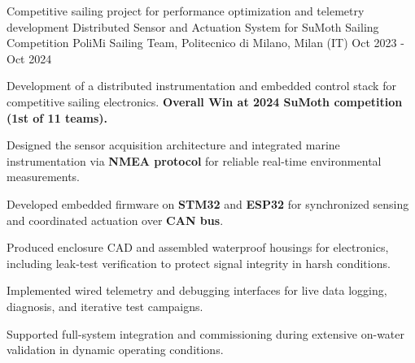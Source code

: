 
\cventry
{Competitive sailing project for performance optimization and telemetry development}
{Distributed Sensor and Actuation System for SuMoth Sailing Competition}
{PoliMi Sailing Team, Politecnico di Milano, Milan (IT)}
{Oct 2023 - Oct 2024}
{
    Development of a distributed instrumentation and embedded control stack for competitive sailing electronics. \textbf{Overall Win at 2024 SuMoth competition (1st of 11 teams).}
    \newline
    \vspace{4mm}
    \begin{cvitems}
        \item {Designed the sensor acquisition architecture and integrated marine instrumentation via \textbf{NMEA protocol} for reliable real-time environmental measurements.}
        \item {Developed embedded firmware on \textbf{STM32} and \textbf{ESP32} for synchronized sensing and coordinated actuation over \textbf{CAN bus}.}
        \item {Produced enclosure CAD and assembled waterproof housings for electronics, including leak-test verification to protect signal integrity in harsh conditions.}
        \item {Implemented wired telemetry and debugging interfaces for live data logging, diagnosis, and iterative test campaigns.}
        \item {Supported full-system integration and commissioning during extensive on-water validation in dynamic operating conditions.}
    \end{cvitems}
}
